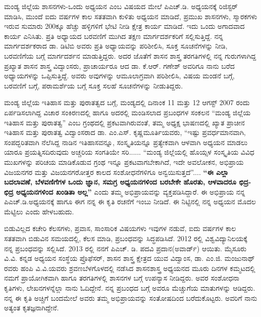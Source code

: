 ಮಂಡ್ಯ ಜಿಲ್ಲೆಯ ಶಾಸನಗಳು{\rm -}ಒಂದು ಅಧ್ಯಯನ ಎಂಬ ವಿಷಯದ ಮೇಲೆ ಪಿಎಚ್​.ಡಿ. ಅಧ್ಯಯನಕ್ಕೆ ರಿಜಿಸ್ಟರ್​ ಮಾಡಿಸಿ, ಮುಂದೆ ಐದು ವರ್ಷಗಳ ಕಾಲ ಸತತವಾಗಿ ಕುಳಿತು ಅಧ್ಯಯನ ಮಾಡಿದೆ, ಪ್ರಮುಖ ಶಾಸನಗಳು, ಸ್ಮಾರಕಗಳು ಇರುವ ಸುಮಾರು 200ಕ್ಕೂ ಹೆಚ್ಚು ಹಳ್ಳಿಗಳಿಗೆ ಭೇಟಿ ನೀಡಿ ಕ್ಷೇತ್ರ ಕಾರ್ಯ ಮಾಡಿದೆ. ಇದು ಒಂದು ಅಗಾದವಾದ ಕಾರ್ಯ ಎನಿಸಿತು. ಪ್ರತಿ ಅಧ್ಯಾಯದ ಬರವಣಿಗೆ ಮುಗಿದ ತಕ್ಷಣ ಮಾರ್ಗದರ್ಶಕರಿಗೆ ಸಲ್ಲಿಸುತ್ತಿದ್ದೆ. ನನ್ನ ಮಾರ್ಗದರ್ಶಕರಾದ ಡಾ. ಡಿಟಿಬಿ ಅವರು ಪ್ರತಿ ಅಧ್ಯಾಯವನ್ನು ಪರಿಶೀಲಿಸಿ, ಸೂಕ್ತ ಸೂಚನೆಗಳನ್ನು ನೀಡಿ, ಬರವಣಿಗೆಯ ಬಗ್ಗೆ ಮಾರ್ಗದರ್ಶನ ಮಾಡುತ್ತಿದ್ದರು. ಅದರ ಜೊತೆಗೆ ಶಾಸನ ಶಾಸ್ತ್ರ ತರಗತಿಗಳಲ್ಲಿ ನನ್ನ ಗುರುಗಳಾಗಿದ್ದ ಪ್ರಖ್ಯಾತ ಶಾಸನ ಶಾಸ್ತ್ರ ವಿದ್ವಾಂಸರು, ಪ್ರಾಚಾರ್ಯರೂ ಆದ ಡಾ. ಕೆ.ಆರ್​. ಗಣೇಶ್​ ಅವರಿಗೂ ನಾನು ಬರೆದ ಅಧ್ಯಾಯಗಳನ್ನು ಒಪ್ಪಿಸುತ್ತಿದ್ದೆ. ಅವರು ಅವುಗಳನ್ನು ಆಮೂಲಾಗ್ರವಾಗಿ ಪರಿಶೀಲಿಸಿ, ವಿಷಯ ಮಂಡನೆ ಬಗ್ಗೆ, ಬರವಣಿಗೆ ಬಗ್ಗೆ, ಪರಾಮರ್ಶೆಯ ಬಗ್ಗೆ ಸೂಕ್ತ ಸಲಹೆ ಸೂಚನೆಗಳನ್ನು ನೀಡುತಿದ್ದರು.

ಮಂಡ್ಯ ಜಿಲ್ಲೆಯ ಇತಿಹಾಸ ಮತ್ತು ಪುರಾತತ್ವದ ಬಗ್ಗೆ, ಮಂಡ್ಯದಲ್ಲಿ ದಿನಾಂಕ 11 ಮತ್ತು 12 ಆಗಸ್ಟ್​ 2007 ರಂದು ಏರ್ಪಡಿಸಲಾಗಿದ್ದ ವಿಚಾರ ಸಂಕಿರಣದಲ್ಲಿ ಹಾಗೂ ಅದರಲ್ಲಿ ಮಂಡಿಸಲಾದ ಪ್ರಬಂಧಗಳ ಸಂಕಲನ “ಮಂಡ್ಯ ಜಿಲ್ಲೆಯ ಇತಿಹಾಸ ಮತ್ತು ಪುರಾತತ್ವ”  ಎಂಬ ಗ್ರಂಥದಲ್ಲಿ ಪ್ರಕಟವಾಗಿರುವಂತೆ, ತಮ್ಮ ಅಧ್ಯಕ್ಷ ಭಾಷಣದಲ್ಲಿ ಖ್ಯಾತ ಪ್ರಾಚೀನ ಇತಿಹಾಸ ಮತ್ತು  ಪುರಾತತ್ವ ವಿದ್ವಾಂಸರಾದ ಡಾ. ಎಂ.ಎಸ್​. ಕೃಷ್ಣಮೂರ್ತಿಯವರು, “ಇಷ್ಟು ಪ್ರವರ್ಧಮಾನವಾಗಿ, ಸಂಪದ್ಭರಿತವಾಗಿ ನೆಲೆಸಿದ್ದ ನಾಡಿನ ಇತಿಹಾಸವನ್ನೂ, ಸಂಸ್ಕೃತಿಯನ್ನೂ ಪ್ರತ್ಯೇಕವಾಗಿ ಆಳವಾಗಿ ಅಧ್ಯಯನ ಮಾಡಲು ಯಾರೂ ಪ್ರಯತ್ನಿಸದಿರುವುದು ಅಚ್ಚರಿಯ ಸಂಗತಿಯೇ ಸರಿ...... “ಮಂಡ್ಯ ಜಿಲ್ಲೆಯಲ್ಲಿ ಹೊಯ್ಸಳ ಸಂಸ್ಕೃತಿಯ ವಿವಿಧ ಮುಖ\-ಗಳನ್ನು ಪರಿಚಯ ಮಾಡಿಕೊಡುವ ಗ್ರಂಥ ಇನ್ನೂ ಪ್ರಕಟವಾಗಬೇಕಾಗಿದೆ, ಇದೇ ಅವಲೋಕನ, ಅಭಿಪ್ರಾಯ ವಿಜಯನಗರ ಮತ್ತು ವಿಜಯನಗರೋತ್ತರ ಕಾಲದ ಸಂಶೋಧನೆಗಳಿಗೂ ಅನ್ವಯಿಸುತ್ತದೆ”.... \textbf{“ಈ ಎಲ್ಲಾ ಬದಲಾವಣೆ, ಬೆಳವಣಿಗೆಗಳ ಒಂದು ಜ್ಞಾನ, ಸಮಗ್ರ ಅಧ್ಯಯನಗಳಿಂದ ಬರಬೇಕೇ ಹೊರತು, ಆಳವಾದರೂ ಛಿದ್ರ{\rm -}ಛಿದ್ರ ಅಧ್ಯಯನಗಳಿಂದ ಖಂಡಿತಾ ಅಲ್ಲ”} ಎಂದು ತಮ್ಮ ಅಭಿಪ್ರಾಯವನ್ನು ವ್ಯಕ್ತಪಡಿಸಿದ್ದಾರೆ. ಈ ಅಭಿಪ್ರಾಯ ನನ್ನ ಪಿಎಚ್​.ಡಿ.ಅಧ್ಯಯನಕ್ಕೆ ಹಾಗೂ ಈಗ ನನ್ನ ಈ  ಕೃತಿ ರಚನೆಗೆ ಇಂಬು ನೀಡಿದೆ. ಈ ನಿಟ್ಟಿನಲ್ಲಿ ನನ್ನ ಅಧ್ಯಯನ ಮೊದಲ ಮೆಟ್ಟಿಲು ಎಂದು ಹೇಳಬಹುದು.

ಬಿಡುವಿಲ್ಲದ ಕಚೇರಿ ಕೆಲಸಗಳು, ಪ್ರವಾಸ, ಸಾಂಸಾರಿಕ ವಿಷಯಗಳು ಇವುಗಳ ನಡುವೆ,  ಐದು ವರ್ಷಗಳ ಕಾಲ ಸತತವಾಗಿ ಬಿಡುವಿನ ಸಮಯದಲ್ಲಿ, ಕೆಲಸ ಮಾಡಿ, ಪ್ರಬಂಧವನ್ನು ಸಿದ್ಧಪಡಿಸಿದೆ. 2012 ರಲ್ಲಿ ವಿಶ್ವವಿದ್ಯಾನಿಲಯಕ್ಕೆ ನನ್ನ ಪ್ರಬಂಧವನ್ನು ಸಲ್ಲಿಸಿದೆ. 2013 ರಲ್ಲಿ ನನಗೆ ಪಿಎಚ್. ಡಿ. ಪದವಿ ಪ್ರದಾನ(ಅವಾರ್ಡ್) ಆಯಿತು. ಮೈಸೂರು ವಿ.ವಿ. ಕನ್ನಡ ಅಧ್ಯಯನ ಸಂಸ್ಥೆಯ ಪ್ರೊಫೆಸರ್​, ಶಾಸನ ಶಾಸ್ತ್ರ ಕ್ಷೇತ್ರದ ಯುವ ವಿದ್ವಾಂಸ,  ಡಾ. ಎಂ.ಜಿ. ಮಂಜುನಾಥ್​ರವರು ಹಂಪಿ ವಿ.ವಿ.ಯವರು ಶ್ರವಣಬೆಳಗೊಳದಲ್ಲಿ ನಡೆಸಿದ ಶಾಸನಶಾಸ್ತ್ರ ಅಧ್ಯಯನದ ಮೂರು ದಿನಗಳ ಕಮ್ಮಟದಲ್ಲಿ ನಮಗೆ ಪ್ರಾಯೋಗಿಕವಾಗಿ ಹಾಗೂ ತರಗತಿಗಳಲ್ಲಿ ಶಾಸನಗಳ ಬಗ್ಗೆ ಉಪನ್ಯಾಸ ನೀಡಿದ್ದರು. ಅವರ ಸಂಶೋಧನಾ ಕೃತಿಗಳು, ಲೇಖನಗಳನ್ನೆಲ್ಲಾ ನಾನು ಓದಿದ್ದೇನೆ. ನನ್ನ ಪ್ರಬಂಧದ ಬಗ್ಗೆ ಅವರೂ ಮೆಚ್ಚುಗೆಯ ಮಾತುಗಳನ್ನು ಆಡಿದ್ದರು. ನನ್ನ ಈ ಕೃತಿ ಅಚ್ಚಿಗೆ ಬಂದಮೇಲೆ ಅವರು ತಮ್ಮ ಅಭಿಪ್ರಾಯವನ್ನು ಸಂತೋಷದಿಂದ ಬರೆದುಕೊಟ್ಟರು. ಅವರಿಗೆ ನಾನು ಅತ್ಯಂತ ಕೃತಜ್ಞನಾಗಿದ್ದೇನೆ.

